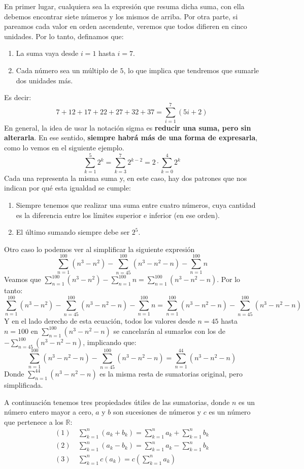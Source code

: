 \documentclass[12pt]{article}
\begin{document}
En primer lugar, cualquiera sea la expresión que resuma dicha suma, con ella debemos encontrar siete números y los mismos de arriba. Por otra parte, si pareamos cada valor en orden ascendente, veremos que todos difieren en cinco unidades. Por lo tanto, definamos que:

\begin{enumerate}
\item La suma vaya desde $i = 1$ hasta $i = 7$.
\item Cada número sea un múltiplo de $5$, lo que implica que tendremos que sumarle dos unidades más.
\end{enumerate}

Es decir:
\[
  7 + 12 + 17 + 22 + 27 + 32 + 37 = \sum_{i = 1}^{7} (5i + 2)
\]
En general, la idea de usar la notación sigma es \textbf{reducir una suma, pero sin alterarla}. En ese sentido, \textbf{siempre habrá más de una forma de expresarla}, como lo vemos en el siguiente ejemplo.
\[
  \sum_{k = 1}^{5} 2^{k} = \sum_{k = 3}^{7} 2^{k - 2} = 2 \cdot \sum_{k = 0}^{4} 2^{k}
\]
Cada una representa la misma suma y, en este caso, hay dos patrones que nos indican por qué esta igualdad se cumple:

\begin{enumerate}
\item Siempre tenemos que realizar una suma entre cuatro números, cuya cantidad es la diferencia entre los límites superior e inferior (en ese orden).
\item El último sumando siempre debe ser $2^{5}$.
\end{enumerate}

Otro caso lo podemos ver al simplificar la siguiente expresión
\[
  \sum_{n = 1}^{100} (n^{3} - n^{2}) - \sum_{n = 45}^{100} (n^{3} - n^{2} - n) - \sum_{n = 1}^{100} n
\]
Veamos que $\sum_{n = 1}^{100} (n^{3} - n^{2}) - \sum_{n = 1}^{100} n = \sum_{n = 1}^{100} (n^{3} - n^{2} - n)$. Por lo tanto:
\[
  \sum_{n = 1}^{100} (n^{3} - n^{2}) - \sum_{n = 45}^{100} (n^{3} - n^{2} - n) - \sum_{n = 1}^{100} n =
    \sum_{n = 1}^{100} (n^{3} - n^{2} - n) - \sum_{n = 45}^{100} (n^{3} - n^{2} - n)
\]
Y en el lado derecho de esta ecuación, todos los valores desde $n = 45$ hasta $n = 100$ en $\sum_{n = 1}^{100} (n^{3} - n^{2} - n)$ se cancelarán al sumarlos con los de $ - \sum_{n = 45}^{100} (n^{3} - n^{2} - n)$, implicando que:
\[
  \sum_{n = 1}^{100} (n^{3} - n^{2} - n) - \sum_{n = 45}^{100} (n^{3} - n^{2} - n) =
    \sum_{n = 1}^{44} (n^{3} - n^{2} - n)
\]
Donde $\sum_{n = 1}^{44} (n^{3} - n^{2} - n)$ es la misma resta de sumatorias original, pero simplificada.

A continuación tenemos tres propiedades útiles de las sumatorias, donde $n$ es un número entero mayor a cero, $a$ y $b$ son sucesiones de números y $c$ es un número que pertenece a los $\mathbb{R}$:
\begin{align*}
(1)& \ \sum_{k = 1}^{n} (a_{k} + b_{k}) = \sum_{k = 1}^{n} a_{k} + \sum_{k = 1}^{n} b_{k} \\
(2)& \ \sum_{k = 1}^{n} (a_{k} - b_{k}) = \sum_{k = 1}^{n} a_{k} - \sum_{k = 1}^{n} b_{k} \\
(3)& \ \sum_{k = 1}^{n} c(a_{k}) = c\left(\sum_{k = 1}^{n} a_{k}\right)
\end{align*}
\end{document}
